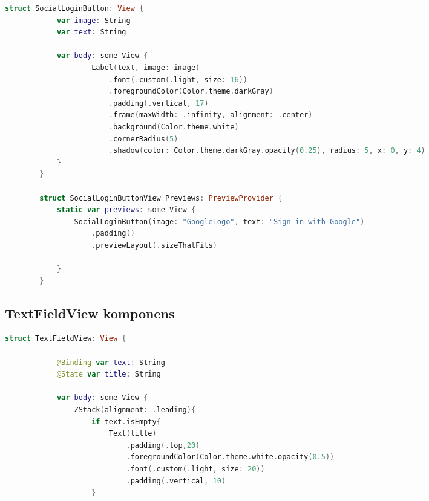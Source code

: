 \begin{spacing}{2}
\end{spacing}
\begin{minipage}{\textwidth}
    \linespread{0.8}\selectfont
    \begin{lstlisting}[language=swift]
        struct SocialLoginButton: View {
            var image: String
            var text: String
            
            var body: some View {
                    Label(text, image: image)
                        .font(.custom(.light, size: 16))
                        .foregroundColor(Color.theme.darkGray)
                        .padding(.vertical, 17)
                        .frame(maxWidth: .infinity, alignment: .center)
                        .background(Color.theme.white)
                        .cornerRadius(5)
                        .shadow(color: Color.theme.darkGray.opacity(0.25), radius: 5, x: 0, y: 4)
            }
        }
        
        struct SocialLoginButtonView_Previews: PreviewProvider {
            static var previews: some View {
                SocialLoginButton(image: "GoogleLogo", text: "Sign in with Google")
                    .padding()
                    .previewLayout(.sizeThatFits)
                
            }
        }
    \end{lstlisting}   
\end{minipage}

\subsection*{TextFieldView komponens}

\begin{spacing}{2}
\end{spacing}
\begin{minipage}{\textwidth}
    \linespread{0.8}\selectfont
    \begin{lstlisting}[language=swift]
        struct TextFieldView: View {
    
            @Binding var text: String
            @State var title: String
            
            var body: some View {
                ZStack(alignment: .leading){
                    if text.isEmpty{
                        Text(title)
                            .padding(.top,20)
                            .foregroundColor(Color.theme.white.opacity(0.5))
                            .font(.custom(.light, size: 20))
                            .padding(.vertical, 10)
                    }            
    \end{lstlisting}   
\end{minipage}

